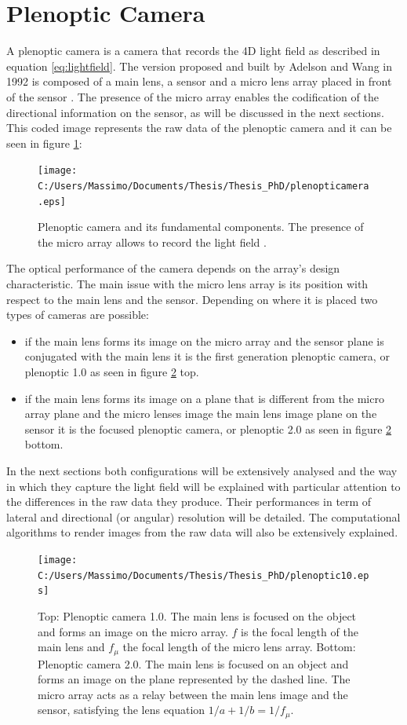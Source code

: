 \section{Plenoptic Camera}
\label{sec:plenoticcamera}
A plenoptic camera is a camera that records the 4D light field as described in equation \ref{eq:lightfield}. The version proposed and built by Adelson and Wang in 1992 \cite{adelson1992single} is composed of a main lens, a sensor and a micro lens array placed in front of the sensor \cite{adelson1992single}. The presence of the micro array enables the codification of the directional information on the sensor, as will be discussed in the next sections. This coded image represents the raw data of the plenoptic camera and it can be seen in figure \ref{fig:plenoptic1}: 
\begin{figure}[H]
	\centering
	\texttt{[image: C:/Users/Massimo/Documents/Thesis/Thesis\_PhD/plenopticamera.eps]}
	\caption{\label{fig:plenoptic1} Plenoptic camera and its fundamental components. The presence of the micro array allows to record the light field .}
\end{figure}
The optical performance of the camera depends on the array's design characteristic. The main issue with the micro lens array is its position with respect to the main lens and the sensor. Depending on where it is placed two types of cameras are possible:
\begin{itemize}
	\item if the main lens forms its image on the micro array and the sensor plane is conjugated with the main lens it is the first generation plenoptic camera, or plenoptic 1.0 \cite{ng2005light} as seen in figure \ref{fig:plenoptic2} top.
	\item if the main lens forms its image on a plane that is different from the micro array plane and the micro lenses image the main lens image plane on the sensor it is the focused plenoptic camera, or plenoptic 2.0 \cite{georgiev2010focused} as seen in figure \ref{fig:plenoptic2} bottom.
\end{itemize}
 In the next sections both configurations will be extensively analysed and the way in which they capture the light field will be explained with particular attention to the differences in the raw data they produce. Their performances in term of lateral and directional (or angular) resolution will be detailed. The computational algorithms to render images from the raw data will also be extensively explained.
\begin{figure}[H]
	\centering
	\texttt{[image: C:/Users/Massimo/Documents/Thesis/Thesis\_PhD/plenoptic10.eps]}
	\caption{\label{fig:plenoptic2}Top: Plenoptic camera 1.0. The main lens is focused on the object and forms an image on the micro array. $f$ is the focal length of the main lens and $f_\mu$ the focal length of the micro lens array. Bottom: Plenoptic camera 2.0. The main lens is focused on an object and forms an image on the plane represented by the dashed line. The micro array acts as a relay between the main lens image and the sensor, satisfying the lens equation $1/a+1/b=1/f_\mu$.}
\end{figure}
